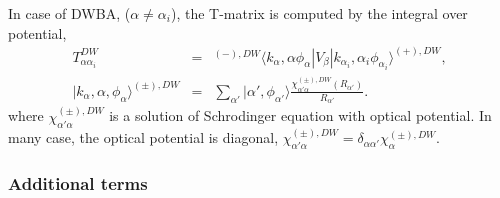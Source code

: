 \documentclass[11pt]{book}
\def\la{\langle}
\def\ra{\rangle}
\newcommand{\bea}{\begin{eqnarray}}
\newcommand{\eea}{\end{eqnarray}}
\newcommand{\no}{\nonumber \\}
\begin{document}
In case of DWBA, ($\alpha\neq \alpha_i$), the T-matrix 
is computed by the integral over potential, 
\bea 
T^{DW}_{\alpha\alpha_i}&=&
{}^{(-),DW}\la k_\alpha, \alpha \phi_\alpha | V_\beta | k_{\alpha_i}, \alpha_i \phi_{\alpha_i}\ra^{(+),DW},\no 
| k_{\alpha}, \alpha,\phi_\alpha\ra^{(\pm),DW}
&=&\sum_{\alpha'} |\alpha',\phi_{\alpha'}\ra \frac{\chi_{\alpha'\alpha}^{(\pm),DW}(R_{\alpha'})}{R_{\alpha'}}.
\eea 
where $\chi_{\alpha'\alpha}^{(\pm),DW}$ is a solution of 
Schrodinger equation with optical potential. In many case, the optical potential
is diagonal, $\chi_{\alpha'\alpha}^{(\pm),DW}
=\delta_{\alpha\alpha'} \chi_{\alpha}^{(\pm),DW}$. 

\subsubsection{Additional terms} 
\end{document}
